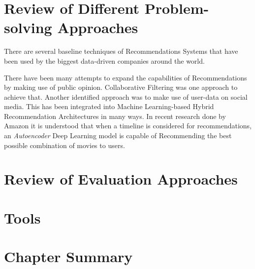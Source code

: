 \section{Review of Different Problem-solving Approaches}
There are several baseline techniques of Recommendations Systems that have been used by the biggest data-driven companies around the world.


\bigbreak
\autocite{larry_history_2019}
There have been many attempts to expand the capabilities of Recommendations by making use of public opinion. Collaborative Filtering was one approach to achieve that. Another identified approach was to make use of user-data on social media. This has been integrated into Machine Learning-based Hybrid Recommendation Architectures in many ways. In recent research done by Amazon \autocite{larry_history_2019} it is understood that when a timeline is considered for recommendations, an \emph{Autoencoder} Deep Learning model is capable of Recommending the best possible combination of movies to users.



\section{Review of Evaluation Approaches}


\section{Tools}


\section{Chapter Summary}
